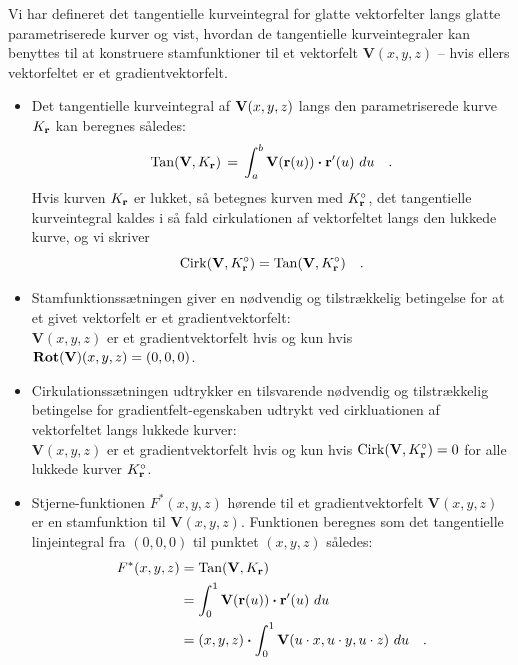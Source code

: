 
\begin{summary}
Vi har defineret det tangentielle kurveintegral for glatte vektorfelter langs glatte pa\-ra\-me\-tri\-se\-re\-de kurver
og vist, hvordan de tangentielle kurveintegraler kan benyttes til at konstruere stamfunktioner til et vektorfelt $\mathbf{V}(x,y,z)$ -- hvis ellers vektorfeltet er et gradientvektorfelt.
\begin{itemize}
\item Det tangentielle kurveintegral af ${\bf V}(x,y,z)$ langs den parametriserede kurve $K_{\bf r}$ kan beregnes således:
\begin{equation}
\operatorname{Tan}({\bf V}, K_{\bf r})\, = \, \int_{a}^{b}{\bf V}({\bf r}(u))\bm{\cdot} {\bf r}'(u)\,\,du \quad .
\end{equation}
Hvis kurven $K_{\bf r}$ er lukket, så betegnes kurven med $K_{\bf r}^{\circ}$, det tangentielle kurveintegral kaldes i så fald cirkulationen af vektorfeltet langs den lukkede kurve, og vi skriver
\begin{equation}
\operatorname{Cirk}(\mathbf{V}, K_{\bf r}^{\circ}) = \operatorname{Tan}(\mathbf{V}, K_{\bf r}^{\circ}) \quad .
\end{equation}
\item Stamfunktionssætningen giver en nødvendig og tilstrækkelig betingelse for at et givet vektorfelt er et gradientvektorfelt: \\

$\mathbf{V}(x,y,z)$ er et gradientvektorfelt hvis og kun hvis $\operatorname{\bf{Rot}}(\mathbf{V})(x,y,z)=(0,0,0)$. \\

\item Cirkulationssætningen udtrykker en tilsvarende nødvendig og tilstrækkelig betingelse for gradientfelt-egenskaben udtrykt ved cirkluationen af vektorfeltet langs lukkede kurver:\\

    $\mathbf{V}(x,y,z)$ er et gradientvektorfelt hvis og kun hvis $\operatorname{Cirk}(\mathbf{V}, K_{\bf r}^{\circ}) =0$ for alle lukkede kurver $K_{\bf r}^{\circ}$.\\

\item Stjerne-funktionen $F^{*}(x,y,z)$ hørende til et gradientvektorfelt $\mathbf{V}(x,y,z)$ er en stamfunktion til $\mathbf{V}(x,y,z)$. Funktionen beregnes som det tangentielle linjeintegral fra $(0,0,0)$ til punktet $(x,y,z)$ således:
    \begin{equation}
\begin{aligned}
F^{*}(x, y, z) &= \operatorname{Tan}({\bf V}, K_{\bf r}) \\
&=  \int_{0}^{1}{\bf V}({\bf r}(u))\bm{\cdot} {\bf r}'(u)\,\,du  \\
&=  (x, y, z) \bm{\cdot} \int_{0}^{1}{\bf V}(u\cdot x, u\cdot y, u\cdot z) \,\,du  \quad .
\end{aligned}
\end{equation}
\end{itemize}
\end{summary}


